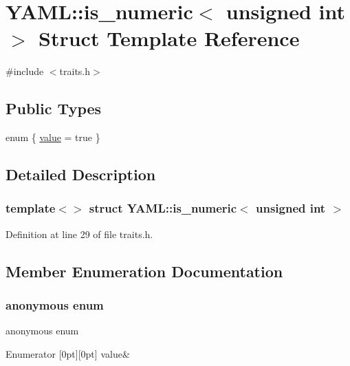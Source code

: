 \hypertarget{struct_y_a_m_l_1_1is__numeric_3_01unsigned_01int_01_4}{}\section{Y\+A\+ML\+::is\+\_\+numeric$<$ unsigned int $>$ Struct Template Reference}
\label{struct_y_a_m_l_1_1is__numeric_3_01unsigned_01int_01_4}


{\ttfamily \#include $<$traits.\+h$>$}

\subsection*{Public Types}
\begin{DoxyCompactItemize}
\item 
enum \{ \mbox{\hyperlink{struct_y_a_m_l_1_1is__numeric_3_01unsigned_01int_01_4_a60686121a58d7961f812868e94cb07dda8b02ddc96fb6000f6f36321f389fbd84}{value}} = true
 \}
\end{DoxyCompactItemize}


\subsection{Detailed Description}
\subsubsection*{template$<$$>$\newline
struct Y\+A\+M\+L\+::is\+\_\+numeric$<$ unsigned int $>$}



Definition at line 29 of file traits.\+h.



\subsection{Member Enumeration Documentation}
\mbox{\label{struct_y_a_m_l_1_1is__numeric_3_01unsigned_01int_01_4_a60686121a58d7961f812868e94cb07dd}} 
\subsubsection{\texorpdfstring{anonymous enum}{anonymous enum}}
{\footnotesize\ttfamily anonymous enum}

\begin{DoxyEnumFields}{Enumerator}
[0pt][0pt]{}\mbox{\label{struct_y_a_m_l_1_1is__numeric_3_01unsigned_01int_01_4_a60686121a58d7961f812868e94cb07dda8b02ddc96fb6000f6f36321f389fbd84}} 
value&\\
\hline

\end{DoxyEnumFields}


